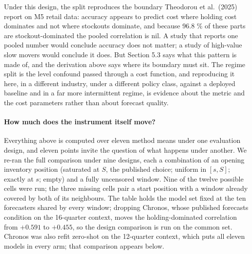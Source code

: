 \documentclass[11pt]{article}
\begin{document}
Under this design, the split reproduces the boundary Theodorou et al.\ (2025)
report on M5 retail data: accuracy appears to predict cost where holding cost
dominates and not where stockouts dominate, and because 96.8 \% of these parts
are stockout-dominated the pooled correlation is nil. A study that reports one
pooled number would conclude accuracy does not matter; a study of high-value
slow movers would conclude it does. But Section 5.3 says what this pattern is
made of, and the derivation above says where its boundary must sit. The regime
split is the level confound passed through a cost function, and reproducing it
here, in a different industry, under a different policy class, against a
deployed baseline and in a far more intermittent regime, is evidence about the
metric and the cost parameters rather than about forecast quality.

\paragraph{How much does the instrument itself move?} Everything above is
computed over eleven method means under one evaluation design, and eleven
points invite the question of what happens under another. We re-ran the full
comparison under nine designs, each a combination of an opening inventory
position (saturated at $S$, the published choice; uniform in $[s, S]$; exactly
at $s$; empty) and a fully uncensored window. Nine of the twelve possible
cells were run; the three missing cells pair a start position with a window
already covered by both of its neighbours. The table holds the model set fixed
at the ten forecasters shared by every window; dropping Chronos, whose
published forecasts condition on the 16-quarter context, moves the
holding-dominated correlation from $+0.591$ to $+0.455$, so the design
comparison is run on the common set. Chronos was also refit zero-shot on the
12-quarter context, which puts all eleven models in every arm; that comparison
appears below.
\end{document}

